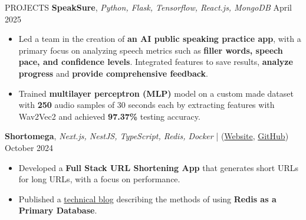 \documentclass{resume} %
\begin{document}
\begin{rSection}{PROJECTS}
     \textbf{SpeakSure}, \textit{Python, Flask, Tensorflow, React.js, MongoDB}  \hfill {April 2025}
    \begin{itemize}
        \setlength\itemsep{-0.6em}
        \item  Led a team in the creation of \textbf{an AI public speaking practice app}, with
              a primary focus on analyzing speech metrics such as \textbf{filler words,
                  speech pace, and confidence levels}. Integrated features to save results, \textbf{analyze progress} and \textbf{provide comprehensive feedback}.
        \item Trained \textbf{multilayer perceptron (MLP)} model on a custom made dataset with \textbf{250} audio samples of 30 seconds each by extracting features with Wav2Vec2 and achieved \textbf{97.37\%} testing accuracy.
    \end{itemize}

  \textbf{Shortomega}, \textit{Next.js, NestJS, TypeScript, Redis, Docker} | (\href{https://shortomega.vercel.app/} {Website}, \href{https://github.com/ninadnaik10/shortomega} {GitHub})  \hfill {October 2024}
    \begin{itemize}
        \setlength\itemsep{-0.6em}
        \item  Developed a \textbf{ Full Stack URL Shortening App} that generates short URLs for long URLs, with a focus on performance.
        \item  Published a \href{https://tech.ninadnaik.me/using-redis-as-a-primary-database}{technical blog} describing the methods of using \textbf{Redis as a Primary Database}.


\end{itemize}
\end{rSection}
\end{document}

